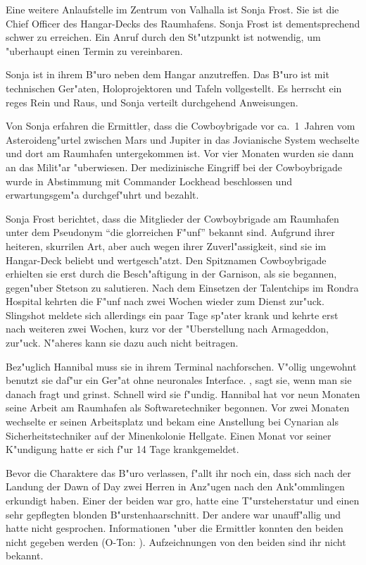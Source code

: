 
Eine weitere Anlaufstelle im Zentrum von Valhalla ist Sonja Frost. Sie ist die Chief Officer des Hangar-Decks des Raumhafens. Sonja Frost ist dementsprechend schwer zu erreichen. Ein Anruf durch den St"utzpunkt ist notwendig, um "uberhaupt einen Termin zu vereinbaren.

Sonja ist in ihrem B"uro neben dem Hangar anzutreffen. Das B"uro ist mit technischen Ger"aten, Holoprojektoren und Tafeln vollgestellt. Es herrscht ein reges Rein und Raus, und Sonja verteilt durchgehend Anweisungen.

Von Sonja erfahren die Ermittler, dass die Cowboybrigade vor ca.~1\half~Jahren vom Asteroideng"urtel zwischen Mars und Jupiter in das Jovianische System wechselte und dort am Raumhafen untergekommen ist. Vor vier Monaten wurden sie dann an das Milit"ar "uberwiesen. Der medizinische Eingriff bei der Cowboybrigade wurde in Abstimmung mit Commander Lockhead beschlossen und erwartungsgem"a\3 durchgef"uhrt und bezahlt.

Sonja Frost berichtet, dass die Mitglieder der Cowboybrigade am Raumhafen unter dem Pseudonym ``die glorreichen F"unf'' bekannt sind. Aufgrund ihrer heiteren, skurrilen Art, aber auch wegen ihrer Zuverl"assigkeit, sind sie im Hangar-Deck beliebt und wertgesch"atzt. Den Spitznamen Cowboybrigade erhielten sie erst durch die Besch"aftigung in der Garnison, als sie begannen, gegen"uber Stetson zu salutieren. Nach dem Einsetzen der Talentchips im Rondra Hospital kehrten die F"unf nach zwei Wochen wieder zum Dienst zur"uck. Slingshot meldete sich allerdings ein paar Tage sp"ater krank und kehrte erst nach weiteren zwei Wochen, kurz vor der "Uberstellung nach Armageddon, zur"uck. N"aheres kann sie dazu auch nicht beitragen.

Bez"uglich Hannibal muss sie in ihrem Terminal nachforschen. V"ollig ungewohnt benutzt sie daf"ur ein Ger"at ohne neuronales Interface. , sagt sie, wenn man sie danach fragt und grinst. Schnell wird sie f"undig. Hannibal hat vor neun Monaten seine Arbeit am Raumhafen als Softwaretechniker begonnen. Vor zwei Monaten wechselte er seinen Arbeitsplatz und bekam eine Anstellung bei Cynarian als Sicherheitstechniker auf der Minenkolonie Hellgate. Einen Monat vor seiner K"undigung hatte er sich f"ur 14 Tage krankgemeldet.

Bevor die Charaktere das B"uro verlassen, f"allt ihr noch ein, dass sich nach der Landung der Dawn of Day zwei Herren in Anz"ugen nach den Ank"ommlingen erkundigt haben. Einer der beiden war gro\3, hatte eine T"ursteherstatur und einen sehr gepflegten blonden B"urstenhaarschnitt. Der andere war unauff"allig und hatte nicht gesprochen. Informationen "uber die Ermittler konnten den beiden nicht gegeben werden (O-Ton: ). Aufzeichnungen von den beiden sind ihr nicht bekannt.

